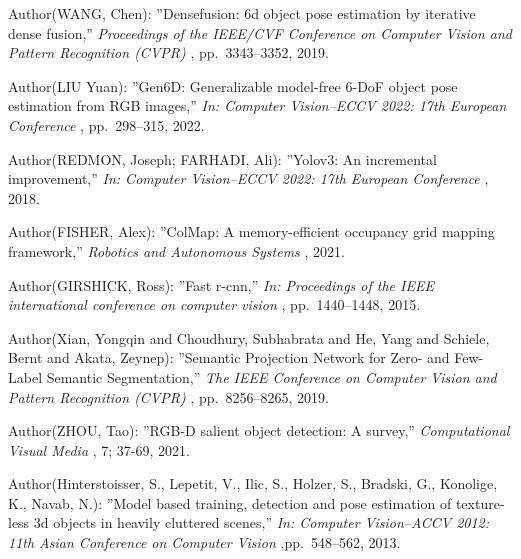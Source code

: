 \begin{thebibliography}{9}
		Author(WANG, Chen):
			''Densefusion: 6d object pose estimation by iterative dense fusion,''
			{\it Proceedings of the IEEE/CVF Conference on Computer Vision and Pattern Recognition (CVPR)}
			, pp.~3343--3352, 2019.

	Author(LIU Yuan):
		''Gen6D: Generalizable model-free 6-DoF object pose estimation from RGB images,''
		{\it In: Computer Vision–ECCV 2022: 17th European Conference}
		, pp.~298--315, 2022.
			
	Author(REDMON, Joseph; FARHADI, Ali):
		''Yolov3: An incremental improvement,''
		{\it In: Computer Vision–ECCV 2022: 17th European Conference}
		, 2018.

	Author(FISHER, Alex):
		''ColMap: A memory-efficient occupancy grid mapping framework,''
		{\it Robotics and Autonomous Systems}
		, 2021.

	Author(GIRSHICK, Ross):
		''Fast r-cnn,''
		{\it In: Proceedings of the IEEE international conference on computer vision}
		, pp.~1440--1448, 2015.

	Author(Xian, Yongqin and Choudhury, Subhabrata and He, Yang and Schiele, Bernt and Akata, Zeynep):
		''Semantic Projection Network for Zero- and Few-Label Semantic Segmentation,''
		{\it The IEEE Conference on Computer Vision and Pattern Recognition (CVPR)}
		, pp.~8256--8265, 2019.

	Author(ZHOU, Tao):
		''RGB-D salient object detection: A survey,''
		{\it Computational Visual Media}
		, 7; 37-69, 2021.

		Author(Hinterstoisser, S., Lepetit, V., Ilic, S., Holzer, S., Bradski, G., Konolige, K., Navab, N.):
			''Model based training, detection and pose estimation of texture-less 3d objects in heavily cluttered scenes,''
			{\it In: Computer Vision–ACCV 2012: 11th Asian Conference on Computer Vision}
			,pp.~548--562, 2013.
\end{thebibliography}
